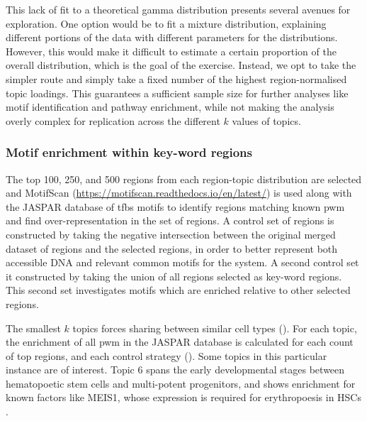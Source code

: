 This lack of fit to a theoretical gamma distribution presents several avenues for exploration. One option would be to fit a mixture distribution, explaining different portions of the data with different parameters for the distributions. However, this would make it difficult to estimate a certain proportion of the overall distribution, which is the goal of the exercise. Instead, we opt to take the simpler route and simply take a fixed number of the highest region-normalised topic loadings. This guarantees a sufficient sample size for further analyses like motif identification and pathway enrichment, while not making the analysis overly complex for replication across the different $k$ values of topics.

\subsubsection{Motif enrichment within key-word regions}

The top 100, 250, and 500 regions from each region-topic distribution are selected and MotifScan (\url{https://motifscan.readthedocs.io/en/latest/}) is used along with the JASPAR database of \gls{tfbs} motifs to identify regions matching known \gls{pwm} and find over-representation in the set of regions. A control set of regions is constructed by taking the negative intersection between the original merged dataset of regions and the selected regions, in order to better represent both accessible DNA and relevant common motifs for the system. A second control set it constructed by taking the union of all regions selected as key-word regions. This second set investigates motifs which are enriched relative to other selected regions.

The smallest $k$ topics forces sharing between similar cell types (). For each topic, the enrichment of all \gls{pwm} in the JASPAR database is calculated for each count of top regions, and each control strategy (). Some topics in this particular instance are of interest. Topic 6 spans the early developmental stages between hematopoetic stem cells and multi-potent progenitors, and shows enrichment for known factors like MEIS1, whose expression is required for erythropoesis in HSCs \cite{Miller2016,Zeddies2014,Unnisa2012}.  

